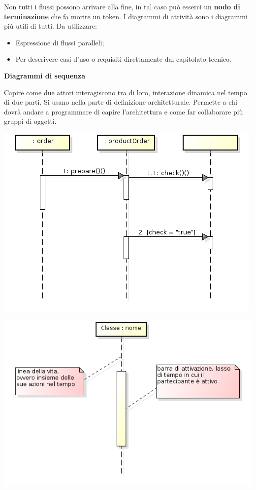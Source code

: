 Non tutti i flussi possono arrivare alla fine, in tal caso può esserci un \textbf{nodo di terminazione} che fa morire un token. I diagrammi di attività sono i diagrammi più utili di tutti. Da utilizzare:

\begin{itemize}

	\item Espressione di flussi paralleli;
	\item Per descrivere casi d'uso o requisiti direttamente dal capitolato tecnico.

\end{itemize}

\textbf{Diagrammi di sequenza}

Capire come due attori interagiscono tra di loro, interazione dinamica nel tempo di due parti. Si usano nella parte di definizione architetturale. Permette a chi dovrà andare a programmare di capire l'architettura e come far collaborare più gruppi di oggetti.

\begin{center}
\includegraphics[width=0.75\columnwidth]{img4} %
\end{center}

\begin{center}
\includegraphics[width=0.75\columnwidth]{img6} %
\end{center}

